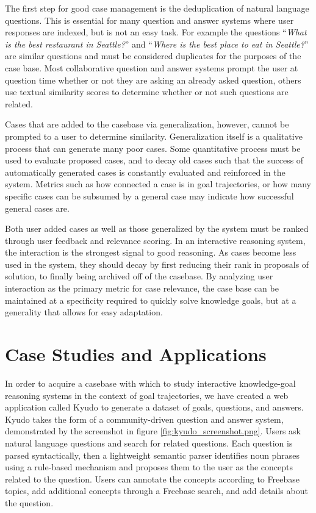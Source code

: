 \documentclass{llncs}
\begin{document}
The first step for good case management is the deduplication of natural language questions. This is essential for many question and answer systems where user responses are indexed, but is not an easy task. For example the questions ``\textit{What is the best restaurant in Seattle?}'' and ``\textit{Where is the best place to eat in Seattle?}'' are similar questions and must be considered duplicates for the purposes of the case base. Most collaborative question and answer systems prompt the user at question time whether or not they are asking an already asked question, others use textual similarity scores to determine whether or not such questions are related.

Cases that are added to the casebase via generalization, however, cannot be prompted to a user to determine similarity. Generalization itself is a qualitative process that can generate many poor cases. Some quantitative process must be used to evaluate proposed cases, and to decay old cases such that the success of automatically generated cases is constantly evaluated and reinforced in the system. Metrics such as how connected a case is in goal trajectories, or how many specific cases can be subsumed by a general case may indicate how successful general cases are.

Both user added cases as well as those generalized by the system must be ranked through user feedback and relevance scoring. In an interactive reasoning system, the interaction is the strongest signal to good reasoning. As cases become less used in the system, they should decay by first reducing their rank in proposals of solution, to finally being archived off of the casebase. By analyzing user interaction as the primary metric for case relevance, the case base can be maintained at a specificity required to quickly solve knowledge goals, but at a generality that allows for easy adaptation.

\section{Case Studies and Applications}

In order to acquire a casebase with which to study interactive knowledge-goal reasoning systems in the context of goal trajectories, we have created a web application called Kyudo to generate a dataset of goals, questions, and answers. Kyudo takes the form of a community-driven question and answer system, demonstrated by the screenshot in figure \ref{fig:kyudo_screenshot.png}. Users ask natural language questions and search for related questions. Each question is parsed syntactically, then a lightweight semantic parser identifies noun phrases using a rule-based mechanism and proposes them to the user as the concepts related to the question. Users can annotate the concepts according to Freebase topics, add additional concepts through a Freebase search, and add details about the question.
\end{document}
